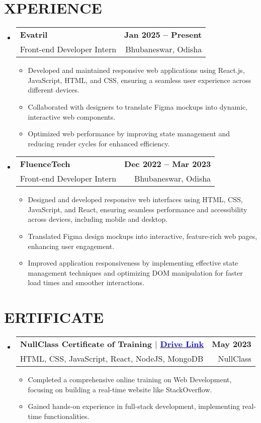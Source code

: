 \documentclass[letterpaper,11pt]{article}
\makeatletter
\newcommand{\resumeItem}[1]{
  \item\small{
    {#1 \vspace{-2pt}}
  }
}
\newcommand{\resumeSubheading}[4]{
  \vspace{-2pt}\item
    \begin{tabular*}{1.0\textwidth}[t]{l@{\extracolsep{\fill}}r}
      \textbf{#1} & \textbf{\small #2} \\
      #3 & #4 \\
    \end{tabular*}\vspace{-7pt}
}
\newcommand{\resumeSubHeadingListStart}{\begin{itemize}[leftmargin=0.0in, label={}]}
\newcommand{\resumeSubHeadingListEnd}{\end{itemize}}
\newcommand{\resumeItemListStart}{\begin{itemize}}
\newcommand{\resumeItemListEnd}{\end{itemize}\vspace{-5pt}}
\makeatother
\begin{document}
\section{\textrm{\scalebox{1.2}{E}XPERIENCE}}

  \resumeSubHeadingListStart

    \resumeSubheading
      {Evatril}{Jan 2025 -- Present}
      {Front-end Developer Intern}{Bhubaneswar, Odisha}
      \resumeItemListStart
        \resumeItem{Developed and maintained responsive web applications using React.js, JavaScript, HTML, and CSS, ensuring a seamless user experience across different devices.}
        \resumeItem{Collaborated with designers to translate Figma mockups into dynamic, interactive web components.}
        \resumeItem{Optimized web performance by improving state management and reducing render cycles for enhanced efficiency.}
      \resumeItemListEnd
    \vspace{5pt}
    \resumeSubheading
      {FluenceTech}{Dec 2022 -- Mar 2023}
      {Front-end Developer Intern}{Bhubaneswar, Odisha}
      \resumeItemListStart
        \resumeItem{Designed and developed responsive web interfaces using HTML, CSS, JavaScript, and React, ensuring seamless performance and accessibility across devices, including mobile and desktop.}
        \resumeItem{Translated Figma design mockups into interactive, feature-rich web pages, enhancing user engagement.}
        \resumeItem{Improved application responsiveness by implementing effective state management techniques and optimizing DOM manipulation for faster load times and smoother interactions.}
      \resumeItemListEnd
    \vspace{5pt}
  \resumeSubHeadingListEnd


\section{\textrm{\scalebox{1.2}{C}ERTIFICATE}}

    \resumeSubHeadingListStart
    \resumeSubheading
        {NullClass Certificate of Training $|$ \href{https://drive.google.com/file/d/1GZ8qfVwk2DCE8oYuyjaqF5XNRdcQWHjE/view}{\raisebox{0.09\height}{\scalebox{0.8}{\faFileContract}} \underline{\textcolor{Blue}{\textnormal{Drive Link}}}}}
        {May 2023}
        {HTML, CSS, JavaScript, React, NodeJS, MongoDB}
        {NullClass}
        \resumeItemListStart
            \resumeItem{Completed a comprehensive online training on Web Development, focusing on building a real-time website like StackOverflow.}
            \resumeItem{Gained hands-on experience in full-stack development, implementing real-time functionalities.}
        \resumeItemListEnd
    \vspace{5pt}
\resumeSubHeadingListEnd
\end{document}
